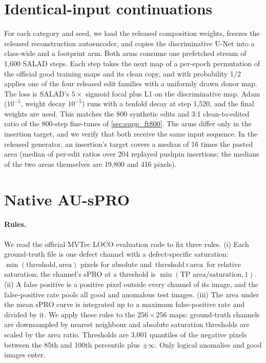 \section{Identical-input continuations}
\label{sec:supp_ft}
For each category and seed, we load the released composition weights, freezes the released reconstruction autoencoder, and copies the discriminative U-Net into a class-wide and a footprint arm. Both arms consume one prefetched stream of 1{,}600 SALAD steps. Each step takes the next map of a per-epoch permutation of the official good training maps and its clean copy, and with probability 1/2 applies one of the four released edit families with a uniformly drawn donor map. The loss is SALAD's $5\times$ sigmoid focal plus L1 on the discriminative map. Adam ($10^{-5}$, weight decay $10^{-5}$) runs with a tenfold decay at step 1{,}520, and the final weights are used. This matches the 800 synthetic edits and 3:1 clean-to-edited ratio of the 800-step fine-tunes of \cref{sec:supp_ft800}. The arms differ only in the insertion target, and we verify that both receive the same input sequence. In the released generator, an insertion's target covers a median of 16 times the pasted area (median of per-edit ratios over 204 replayed pushpin insertions; the medians of the two areas themselves are 19{,}800 and 416 pixels).

\section{Native AU-sPRO}
\label{sec:supp_native}
\begin{table}[t]
\centering
\caption{Localization of real logical defects by category (AU-sPRO up to 5\% FPR, \%). Class-wide and footprint heads continue the released head for 1.6k steps on identical inputs; the last two columns are paired differences with 95\% bootstrap intervals. Bold: best head in each row.}
\label{tab:native_main}
\small\setlength{\tabcolsep}{4.6pt}

\end{table}

\paragraph{Rules.} We read the official MVTec LOCO evaluation code to fix three rules. (i) Each ground-truth file is one defect channel with a defect-specific saturation: $\min(\text{threshold},\text{area})$ pixels for absolute and $\text{threshold}\times\text{area}$ for relative saturation; the channel's sPRO at a threshold is $\min(\text{TP area}/\text{saturation},1)$. (ii) A false positive is a positive pixel outside every channel of its image, and the false-positive rate pools all good and anomalous test images. (iii) The area under the mean sPRO curve is integrated up to a maximum false-positive rate and divided by it. We apply these rules to the $256{\times}256$ maps: ground-truth channels are downsampled by nearest neighbour and absolute saturation thresholds are scaled by the area ratio. Thresholds are 3{,}001 quantiles of the negative pixels between the 85th and 100th percentile plus $\pm\infty$. Only logical anomalies and good images enter.
